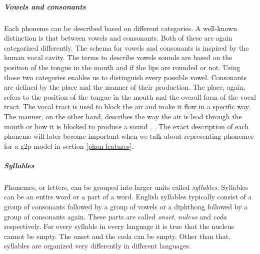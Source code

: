 \subparagraph{Vowels and consonants} Each phoneme can be described based on different categories. A well-known distinction is that between vowels and consonants. Both of these are again categorized differently. The schema for vowels and consonants is inspired by the human vocal cavity. The terms to describe vowels sounds are based on the position of the tongue in the mouth and if the lips are rounded or not. Using those two categories enables us to distinguish every possible vowel. Consonants are defined by the place and the manner of their production. The place, again, refers to the position of the tongue in the mouth and the overall form of the vocal tract. The vocal tract is used to block the air and make it flow in a specific way. The manner, on the other hand, describes the way the air is lead through the mouth or how it is blocked to produce a sound \citep{phonetics-video}. . The exact description of each phoneme will later become important when we talk about representing phonemes for a \ac{g2p} model in section \ref{phon-features}. 

\subparagraph{Syllables} Phonemes, or letters, can be grouped into larger units called \textit{syllables}. Syllables can be an entire word or a part of a word. English syllables typically consist of a group of consonants followed by a group of vowels or a diphthong followed by a group of consonants again. These parts are called \textit{onset}, \textit{nuleus} and \textit{coda} respectively.  For every syllable in every language it is true that the nucleus cannot be empty. The onset and the coda can be empty. Other than that, syllables are organized very differently in different languages. \citep{Intro.2007}



